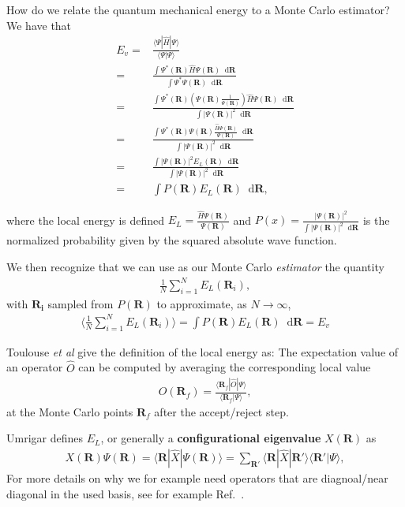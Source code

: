 \documentclass[twoside,english]{uiofysmaster}
\newcommand*\dif{\mathop{}\!\mathrm{d}}
\begin{document}
How do we relate the quantum mechanical energy to a Monte Carlo estimator? We have that \cite{Toulouse2016}
\begin{align}
	E_v =& \frac{\langle \Psi | \hat{H} | \Psi \rangle}{\langle \Psi | \Psi \rangle}  \\
	=& \frac{ \int \Psi^\ast (\bm{R}) \hat{H} \Psi(\bm{R}) \dif \bm{R} }
	{\int \Psi^\ast \Psi(\bm{R}) \dif \bm{R}} \\
	=& \frac{ \int \Psi^\ast (\bm{R}) (\Psi(\bm{R}) \frac{1}{\Psi(\bm{R})}) \hat{H} \Psi(\bm{R}) \dif \bm{R} }
	{\int | \Psi(\bm{R})|^2 \dif \bm{R}} \\
	=&  \frac{ \int \Psi^\ast (\bm{R}) \Psi(\bm{R}) \frac{\hat{H} \Psi(\bm{R}) }{\Psi(\bm{R})}  \dif \bm{R} }
	{\int | \Psi(\bm{R})|^2 \dif \bm{R}} \\
	=&  \frac{ \int | \Psi(\bm{R})|^2  E_L(\bm{R})  \dif \bm{R} }
	{\int | \Psi(\bm{R})|^2 \dif \bm{R}} \\
	=& \int P(\bm{R}) E_L (\bm{R}) \dif \bm{R},
\end{align}

where the local energy is defined $E_L = \frac{\hat{H} \Psi(\bm{R})
}{\Psi(\bm{R})} $ and $P(x) = \frac{| \Psi(\bm{R})|^2 }{ \int |
  \Psi(\bm{R})|^2 \dif \bm{R} }$ is the normalized probability given
by the squared absolute wave function.

We then recognize that we can use as our Monte Carlo \textit{estimator} the quantity
\begin{align}
	\frac{1}{N} \sum_{i=1}^N E_L(\bm{R}_i),
\end{align}
with $\bm{R_i}$ sampled from $P(\bm{R})$ to approximate, as $N \rightarrow \infty$, 
\begin{align}
	\langle \frac{1}{N} \sum_{i=1}^N E_L(\bm{R}_i) \rangle = \int P(\bm{R}) E_L(\bm{R}) \dif \bm{R} = E_v
\end{align}

Toulouse {\em et al} \cite{Toulouse2016} give the definition of the local
energy as: The expectation value of an operator $\hat{O}$ can be
computed by averaging the corresponding local value
\begin{align}
	O(\bm{R}_f) = \frac{ \langle \bm{R}_f | \hat{O} |\Psi \rangle }{ \langle \bm{R}_f | \Psi \rangle },
\end{align}
at the Monte Carlo points $\bm{R}_f$ after the accept/reject step.

Umrigar \cite{Umrigar1999} defines $E_L$, or generally a \textbf{configurational eigenvalue} $X (\bm{R})$ as
\begin{align}
	X(\bm{R}) \Psi(\bm{R}) = \langle \bm{R} | \hat{X} | \Psi(\bm{R}) \rangle
	 = \sum_{\bm{R}'} \langle \bm{R} | \hat{X} | \bm{R}' \rangle \langle \bm{R}' | \Psi \rangle,
\end{align}
For more details on why we for example need operators that are diagnoal/near diagonal in the used basis, see 
for example Ref.~\cite{Umrigar1999}.
\end{document}
